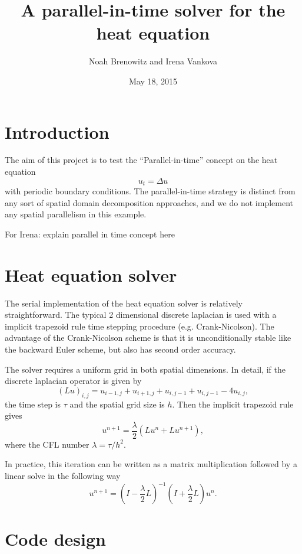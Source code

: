 \documentclass{article}
\title{A parallel-in-time solver for the heat equation}
\author{Noah Brenowitz and Irena Vankova}
\date{May 18, 2015}
\begin{document}
\maketitle
\section{Introduction}
\label{sec:intro}

The aim of this project is to test the ``Parallel-in-time'' concept
on the heat equation 
\[ u_t = \Delta u \]
with periodic boundary conditions. 
The parallel-in-time strategy is distinct from any sort of spatial
domain decomposition approaches, and we do not implement any spatial
parallelism in this example. 

For Irena: explain parallel in time concept here

\section{Heat equation solver}
\label{sec:ehat}

The serial implementation of the heat equation solver is relatively
straightforward. The typical 2 dimensional discrete laplacian is used
with a implicit trapezoid rule time stepping procedure
(e.g. Crank-Nicolson). The advantage of the Crank-Nicolson scheme is
that it is unconditionally stable like the backward Euler scheme, but
also has second order accuracy.

The solver requires a uniform grid in both
spatial dimensions. In detail, if the discrete laplacian operator is
given by
\[ (L u)_{i,j} = u_{i-1,j} + u_{i+1,j} + u_{i,j-1} + u_{i, j-1} - 4 u_{i,j}, \]
the time step is $\tau$ and the spatial grid size is $h$. Then the
implicit trapezoid rule gives
\[ u^{n+1}  = \frac{\lambda}{2} \left( Lu^n + Lu^{n+1} \right),\]
where the CFL number $\lambda = \tau / h^{2}$.

In practice, this iteration can be written as a matrix
multiplication followed by a linear solve in the following way
\begin{equation}
  \label{eq:time-step}
  u^{n+1} = \left( I- \frac{\lambda}{2} L \right)^{-1} \left(I+\frac{\lambda}{2}L \right) u^n.
\end{equation}


\section{Code design}
\label{sec:code}
\end{document}
